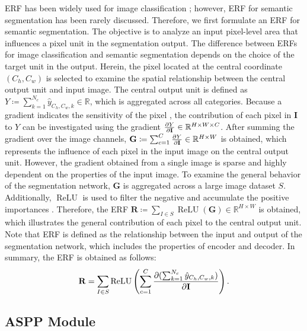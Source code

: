 \documentclass{article}
\newcommand{\R}{\mathbb{R}}
\newcommand{\bI}{\mathbf{I}}
\newcommand{\bG}{\mathbf{G}}
\newcommand{\bR}{\mathbf{R}}
\DeclareMathOperator{\ReLU}{ReLU}
\begin{document}
ERF has been widely used for image classification \citep{DBLP:conf/nips/LuoLUZ16,DBLP:journals/prl/KimCJLJK23}; however, ERF for semantic segmentation has been rarely discussed. Therefore, we first formulate an ERF for semantic segmentation. The objective is to analyze an input pixel-level area that influences a pixel unit in the segmentation output. The difference between ERFs for image classification and semantic segmentation depends on the choice of the target unit in the output. Herein, the pixel located at the central coordinate $(C_h, C_w)$ is selected to examine the spatial relationship between the central output unit and input image. The central output unit is defined as $Y \coloneqq \sum_{k=1}^{N_c}{\hat{y}_{C_h,C_w,k}} \in \R$, which is aggregated across all categories. Because a gradient indicates the sensitivity of the pixel \citep{DBLP:journals/corr/SimonyanVZ13}, the contribution of each pixel in $\bI$ to $Y$ can be investigated using the gradient $\pdv{Y}{\bI} \in \R^{H \times W \times C}$. After summing the gradient over the image channels, $\bG \coloneqq \sum_{c=1}^{C} \pdv{Y}{\bI} \in \R^{H \times W}$ is obtained, which represents the influence of each pixel in the input image on the central output unit. However, the gradient obtained from a single image is sparse and highly dependent on the properties of the input image. To examine the general behavior of the segmentation network, $\bG$ is aggregated across a large image dataset $S$. Additionally, $\ReLU$ is used to filter the negative and accumulate the positive importances \citep{DBLP:journals/ijcv/SelvarajuCDVPB20}. Therefore, the ERF $\bR \coloneqq \sum_{I \in S} \ReLU(\bG) \in \R^{H \times W}$ is obtained, which illustrates the general contribution of each pixel to the central output unit. Note that ERF is defined as the relationship between the input and output of the segmentation network, which includes the properties of encoder and decoder. In summary, the ERF is obtained as follows:
\begin{align}
	\bR = \sum_{I \in S} \ReLU\left(\sum_{c=1}^{C} \pdv{(\sum_{k=1}^{N_c}{\hat{y}_{C_h,C_w,k}})}{\bI}\right).
\end{align}

\subsection{ASPP Module}
\label{sec:aspp}
\end{document}
